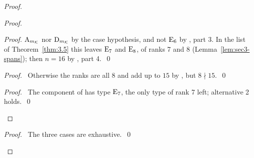 \begin{proof}
\begin{proof}
\begin{proof}
   $\mathrm{A}_{m_{\mathcal K}}$ nor $\mathrm{D}_{m_{\mathcal K}}$ by the case hypothesis, and not $\mathrm{E}_6$ by
   , part 3. In the list of Theorem~\ref{thm:3.5} this leaves $\mathrm{E}_7$ and
   $\mathrm{E}_8$, of ranks 7 and 8 (Lemma~\ref{lem:sec3-spans}); then $n=16$ by
   , part 4.~\qed\end{proof}
  \begin{proof}\pf\ Otherwise the ranks are all 8 and add up to $15$ by , but
   $8\nmid15$.~\qed\end{proof}
  \qedstep
  \begin{proof}\pf\ The component of  has type $\mathrm{E}_7$, the only type of
   rank 7 left; alternative 2 holds.~\qed\end{proof}
 \end{proof}
 \qedstep
 \begin{proof}\pf\ The three cases are exhaustive.~\qed\end{proof}
\end{proof}

